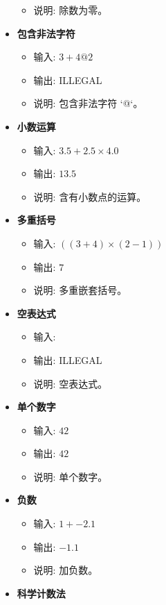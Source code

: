 \documentclass{article}
\begin{document}
\begin{itemize}
\begin{itemize}
        \item 说明: 除数为零。
    \end{itemize}
    \item \textbf{包含非法字符}
    \begin{itemize}
        \item 输入: \(3 + 4 @ 2\)
        \item 输出: ILLEGAL
        \item 说明: 包含非法字符 `@`。
    \end{itemize}
    \item \textbf{小数运算}
    \begin{itemize}
        \item 输入: \(3.5 + 2.5 \times 4.0\)
        \item 输出: \(13.5\)
        \item 说明: 含有小数点的运算。
    \end{itemize}
    \item \textbf{多重括号}
    \begin{itemize}
        \item 输入: \(( ( 3 + 4 ) \times ( 2 - 1 ) )\)
        \item 输出: \(7\)
        \item 说明: 多重嵌套括号。
    \end{itemize}
    \item \textbf{空表达式}
    \begin{itemize}
        \item 输入: \(\)
        \item 输出: ILLEGAL
        \item 说明: 空表达式。
    \end{itemize}
    \item \textbf{单个数字}
    \begin{itemize}
        \item 输入: \(42\)
        \item 输出: \(42\)
        \item 说明: 单个数字。
    \end{itemize}
    \item \textbf{负数}
    \begin{itemize}
        \item 输入: \(1 + -2.1\)
        \item 输出: \(-1.1\)
        \item 说明: 加负数。
    \end{itemize}
    \item \textbf{科学计数法}

\end{itemize}
\end{document}
